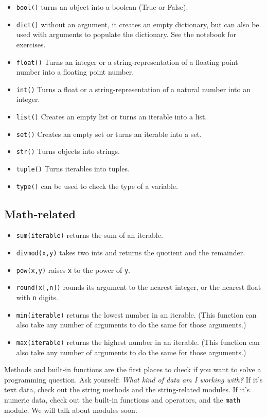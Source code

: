 \documentclass[12pt]{book}
\begin{document}
\begin{itemize}
\item \texttt{bool()} turns an object into a boolean (True or False).
\item \texttt{dict()} without an argument, it creates an empty dictionary, but can also be used with arguments to populate the dictionary. See the notebook for exercises.
\item \texttt{float()} Turns an integer or a string-representation of a  floating point number into a floating point number.
\item \texttt{int()} Turns a float or a string-representation of a natural number into an integer.
\item \texttt{list()} Creates an empty list or turns an iterable into a list.
\item \texttt{set()} Creates an empty set or turns an iterable into a set.
\item \texttt{str()} Turns objects into strings.
\item \texttt{tuple()} Turns iterables into tuples.
\item \texttt{type()} can be used to check the type of a variable.
\end{itemize}

\subsection{Math-related}

\begin{itemize}
\item \texttt{sum(iterable)} returns the sum of an iterable.
\item \texttt{divmod(x,y)} takes two ints and returns the quotient and the remainder.
\item \texttt{pow(x,y)} raises \texttt{x} to the power of \texttt{y}.
\item \texttt{round(x{[},n{]})} rounds its argument to the nearest integer, or the nearest float with \texttt{n} digits.
\item \texttt{min(iterable)} returns the lowest number in an iterable. (This function can also take any number of arguments to do the same for those arguments.)
\item \texttt{max(iterable)} returns the highest number in an iterable. (This function can also take any number of arguments to do the same for those arguments.)
\end{itemize}

Methods and built-in functions are the first places to check if you want to solve a programming question. Ask yourself: \emph{What kind of data am I working with?} If it's text data, check out the string methods and the string-related modules. If it's numeric data, check out the built-in functions and operators, and the \texttt{math} module. We will talk about modules soon.
\end{document}

